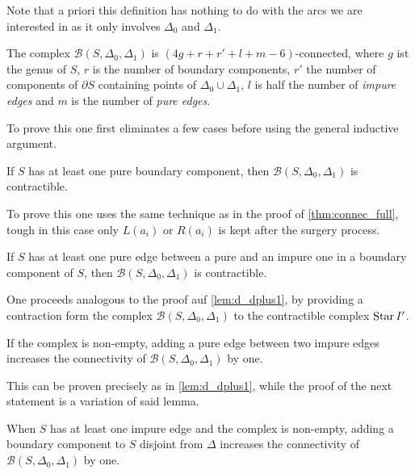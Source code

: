 Note that a priori this definition has nothing to do with the arcs we are interested in as it only involves $\Delta_0$ and $\Delta_1$. 

\begin{theorem}
	The complex $\mathcal{B}(S,\Delta_0,\Delta_1)$ is $(4g +r +r ' +l +m -6)$-connected, where $g$ ist the genus of $S$, $r$ is the number of boundary components, $r'$ the number of components of $\partial S$ containing points of $\Delta_0 \cup \Delta_1$, $l$ is half the number of \emph{impure edges} and $m$ is the number of \emph{pure edges}.
\end{theorem}

To prove this one first eliminates a few cases before using the general inductive argument.


\begin{lemma}[label=lem:44]
	If $S$ has at least one pure boundary component, then $\mathcal{B}(S,\Delta_0,\Delta_1)$ is contractible.
\end{lemma}

To prove this one uses the same technique as in the proof of \autoref{thm:connec_full}, tough in this case only $L(a_i)$ or $R(a_i)$ is kept after the surgery process.

\begin{lemma}[label=lem:45]
	If $S$ has at least one pure edge between a pure and an impure one in a boundary component of $S$, then $\mathcal{B}(S,\Delta_0,\Delta_1)$ is contractible.
\end{lemma}

One proceeds analogous to the proof auf \autoref{lem:d_dplus1}, by providing a contraction form the complex $\mathcal{B}(S,\Delta_0,\Delta_1)$ to the contractible complex $\operatorname{Star}{I'}$.

\begin{lemma}[label=lem:46]
	If the complex is non-empty, adding a pure edge between two impure edges increases the connectivity of $\mathcal{B}(S,\Delta_0,\Delta_1)$ by one.
\end{lemma}

This can be proven precisely as in \autoref{lem:d_dplus1}, while the proof of the next statement is a variation of said lemma.

\begin{lemma}[label=lem:47]
	When $S$ has at least one impure edge and the complex is non-empty, adding a boundary component to $S$ disjoint from $\Delta$ increases the connectivity of $\mathcal{B}(S,\Delta_0,\Delta_1)$ by one.
\end{lemma}


